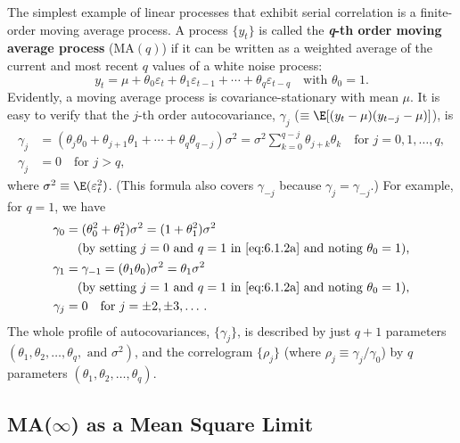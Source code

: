 The simplest example of linear processes that exhibit serial correlation is a finite-order
moving average process. A process $\{y_t\}$ is called the \textbf{\textit{q}-th order moving
average process} ($\text{MA}(q)$) if it can be written as a weighted average of the current
and most recent $q$ values of a white noise process:
\begin{equation}
  y_t = \mu + \theta_0 \varepsilon_t + \theta_1 \varepsilon_{t-1} + \cdots + \theta_q \varepsilon_{t-q}
  \quad \text{with } \theta_0 = 1.
  \label{eq:6.1.1}
\end{equation}
Evidently, a moving average process is covariance-stationary with mean $\mu$. It is
easy to verify that the $j$-th order autocovariance, $\gamma_j$ ($\equiv \E[(y_t - \mu)(y_{t-j} - \mu)]$), is
\begin{align}
  \gamma_j &= (\theta_j \theta_0 + \theta_{j+1} \theta_1 + \cdots + \theta_q \theta_{q-j}) \sigma^2
         = \sigma^2 \sum_{k=0}^{q-j} \theta_{j+k} \theta_k
         \quad \text{for } j = 0, 1, \ldots, q,
  \label{eq:6.1.2a} \\
  \gamma_j &= 0 \quad \text{for } j > q,
  \label{eq:6.1.2b}
\end{align}
where $\sigma^2 \equiv \E(\varepsilon_t^2)$. (This formula also covers $\gamma_{-j}$ because $\gamma_j = \gamma_{-j}$.)
For example, for $q = 1$, we have
\begin{align*}
  \gamma_0 &= (\theta_0^2 + \theta_1^2) \sigma^2 = (1 + \theta_1^2) \sigma^2 \\
  &\quad \text{(by setting $j = 0$ and $q = 1$ in \eqref{eq:6.1.2a} and noting $\theta_0 = 1$),} \\
  \gamma_1 &= \gamma_{-1} = (\theta_1 \theta_0) \sigma^2 = \theta_1 \sigma^2 \\
  &\quad \text{(by setting $j = 1$ and $q = 1$ in \eqref{eq:6.1.2a} and noting $\theta_0 = 1$),} \\
  \gamma_j &= 0 \quad \text{for } j = \pm 2, \pm 3, \ldots\,.
\end{align*}
The whole profile of autocovariances, $\{\gamma_j\}$, is described by just $q + 1$ parameters
$(\theta_1, \theta_2, \ldots, \theta_q, \text{ and } \sigma^2)$, and the correlogram $\{\rho_j\}$
(where $\rho_j \equiv \gamma_j / \gamma_0$) by $q$ parameters $(\theta_1, \theta_2, \ldots, \theta_q)$.

\subsection*{MA($\infty$) as a Mean Square Limit}

